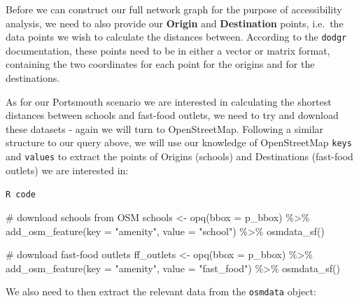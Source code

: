 \documentclass[
  letterpaper,
  DIV=11,
  numbers=noendperiod]{scrreprt}
\newenvironment{Shaded}{\begin{snugshade}}{\end{snugshade}}
\newcommand{\AttributeTok}[1]{\textcolor[rgb]{0.40,0.45,0.13}{#1}}
\newcommand{\CommentTok}[1]{\textcolor[rgb]{0.37,0.37,0.37}{#1}}
\newcommand{\FunctionTok}[1]{\textcolor[rgb]{0.28,0.35,0.67}{#1}}
\newcommand{\NormalTok}[1]{\textcolor[rgb]{0.00,0.23,0.31}{#1}}
\newcommand{\OtherTok}[1]{\textcolor[rgb]{0.00,0.23,0.31}{#1}}
\newcommand{\SpecialCharTok}[1]{\textcolor[rgb]{0.37,0.37,0.37}{#1}}
\newcommand{\StringTok}[1]{\textcolor[rgb]{0.13,0.47,0.30}{#1}}
\begin{document}
Before we can construct our full network graph for the purpose of
accessibility analysis, we need to also provide our \textbf{Origin} and
\textbf{Destination} points, i.e.~the data points we wish to calculate
the distances between. According to the \texttt{dodgr} documentation,
these points need to be in either a vector or matrix format, containing
the two coordinates for each point for the origins and for the
destinations.

As for our Portsmouth scenario we are interested in calculating the
shortest distances between schools and fast-food outlets, we need to try
and download these datasets - again we will turn to OpenStreetMap.
Following a similar structure to our query above, we will use our
knowledge of OpenStreetMap \texttt{keys} and \texttt{values} to extract
the points of Origins (schools) and Destinations (fast-food outlets) we
are interested in:

\begin{codelisting}

\caption{\texttt{R code}}

\begin{Shaded}
\begin{Highlighting}[]
\CommentTok{\# download schools from OSM}
\NormalTok{schools }\OtherTok{\textless{}{-}} \FunctionTok{opq}\NormalTok{(}\AttributeTok{bbox =}\NormalTok{ p\_bbox) }\SpecialCharTok{\%\textgreater{}\%}
    \FunctionTok{add\_osm\_feature}\NormalTok{(}\AttributeTok{key =} \StringTok{"amenity"}\NormalTok{, }\AttributeTok{value =} \StringTok{"school"}\NormalTok{) }\SpecialCharTok{\%\textgreater{}\%}
    \FunctionTok{osmdata\_sf}\NormalTok{()}

\CommentTok{\# download fast{-}food outlets}
\NormalTok{ff\_outlets }\OtherTok{\textless{}{-}} \FunctionTok{opq}\NormalTok{(}\AttributeTok{bbox =}\NormalTok{ p\_bbox) }\SpecialCharTok{\%\textgreater{}\%}
    \FunctionTok{add\_osm\_feature}\NormalTok{(}\AttributeTok{key =} \StringTok{"amenity"}\NormalTok{, }\AttributeTok{value =} \StringTok{"fast\_food"}\NormalTok{) }\SpecialCharTok{\%\textgreater{}\%}
    \FunctionTok{osmdata\_sf}\NormalTok{()}
\end{Highlighting}
\end{Shaded}

\end{codelisting}

We also need to then extract the relevant data from the \texttt{osmdata}
object:
\end{document}
